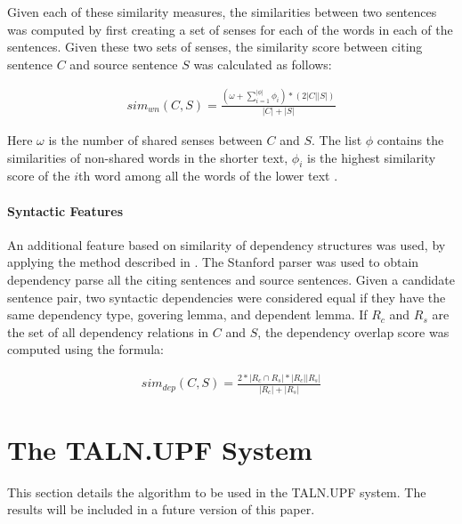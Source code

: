 \documentclass[11pt]{article}
\begin{document}
Given each of these similarity measures, the similarities between two 
sentences was computed by first creating a set of senses for each of the words 
in each of the sentences. Given these two sets of senses, the similarity 
score between citing sentence $C$ and source sentence $S$ was calculated 
as follows:

\begin{eqnarray*}
  sim_{wn}(C,S) = \frac{(\omega + \sum_{i=1}^{|\phi|}\phi_i) * (2|C||S|)}{|C|+|S|}
\end{eqnarray*}

Here $\omega$ is the number of shared senses between $C$ and $S$. The list 
$\phi$ contains the similarities of non-shared words in the shorter text, 
$\phi_i$ is the highest similarity score of the $i$th word among all the 
words of the lower text \cite{S13-1017}. 

\paragraph{Syntactic Features} An additional feature based on similarity of 
dependency structures was used, by applying the method described in 
\cite{S13-1017}. The Stanford parser was used to obtain dependency parse all 
the citing sentences and source sentences. Given a candidate sentence pair, 
two syntactic dependencies were considered equal if they have the same 
dependency type, govering lemma, and dependent lemma. If $R_c$ and $R_s$ are 
the set of all dependency relations in $C$ and $S$, the dependency overlap 
score was computed using the formula:

\begin{eqnarray*}
  sim_{dep}(C,S) = \frac{2*|R_c \cap R_s| * |R_c||R_s|}{|R_c|+|R_s|}
\end{eqnarray*}


\section{The TALN.UPF System}
This section details the algorithm to be used in the TALN.UPF system. The results will be included in a future version of this paper.
\end{document}
